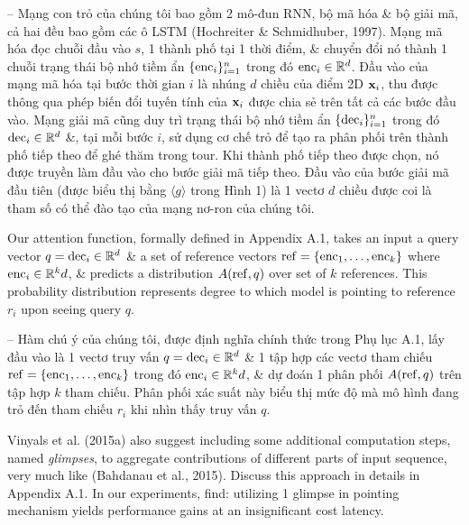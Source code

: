 \documentclass{article}
\begin{document}
\begin{itemize}
\begin{itemize}
        -- Mạng con trỏ của chúng tôi bao gồm 2 mô-đun RNN, bộ mã hóa \& bộ giải mã, cả hai đều bao gồm các ô LSTM (Hochreiter \& Schmidhuber, 1997). Mạng mã hóa đọc chuỗi đầu vào $s$, 1 thành phố tại 1 thời điểm, \& chuyển đổi nó thành 1 chuỗi trạng thái bộ nhớ tiềm ẩn $\{{\rm enc}_i\}_{i=1}^n$ trong đó ${\rm enc}_i\in\mathbb{R}^d$. Đầu vào của mạng mã hóa tại bước thời gian $i$ là nhúng $d$ chiều của điểm 2D ${\bf x}_i$, thu được thông qua phép biến đổi tuyến tính của ${\bf x}_i$ được chia sẻ trên tất cả các bước đầu vào. Mạng giải mã cũng duy trì trạng thái bộ nhớ tiềm ẩn $\{{\rm dec}_i\}_{i=1}^n$ trong đó ${\rm dec}_i\in\mathbb{R}^d$ \&, tại mỗi bước $i$, sử dụng cơ chế trỏ để tạo ra phân phối trên thành phố tiếp theo để ghé thăm trong tour. Khi thành phố tiếp theo được chọn, nó được truyền làm đầu vào cho bước giải mã tiếp theo. Đầu vào của bước giải mã đầu tiên (được biểu thị bằng $\langle g\rangle$ trong Hình 1) là 1 vectơ $d$ chiều được coi là tham số có thể đào tạo của mạng nơ-ron của chúng tôi.
        
        Our attention function, formally defined in Appendix A.1, takes an input a query vector $q = {\rm dec}_i\in\mathbb{R}^d$ \& a set of reference vectors ${\rm ref} = \{{\rm enc}_1,\ldots,{\rm enc}_k\}$ where ${\rm enc}_i\in\mathbb{R}^kd$, \& predicts a distribution $A({\rm ref},q)$ over set of $k$ references. This probability distribution represents degree to which model is pointing to reference $r_i$ upon seeing query $q$.
        
        -- Hàm chú ý của chúng tôi, được định nghĩa chính thức trong Phụ lục A.1, lấy đầu vào là 1 vectơ truy vấn $q = {\rm dec}_i\in\mathbb{R}^d$ \& 1 tập hợp các vectơ tham chiếu ${\rm ref} = \{{\rm enc}_1,\ldots,{\rm enc}_k\}$ trong đó ${\rm enc}_i\in\mathbb{R}^kd$, \& dự đoán 1 phân phối $A({\rm ref},q)$ trên tập hợp $k$ tham chiếu. Phân phối xác suất này biểu thị mức độ mà mô hình đang trỏ đến tham chiếu $r_i$ khi nhìn thấy truy vấn $q$.
        
        Vinyals et al. (2015a) also suggest including some additional computation steps, named {\it glimpses}, to aggregate contributions of different parts of input sequence, very much like (Bahdanau et al., 2015). Discuss this approach in details in Appendix A.1. In our experiments, find: utilizing 1 glimpse in pointing mechanism yields performance gains at an insignificant cost latency.
        

\end{itemize}
\end{itemize}
\end{document}
